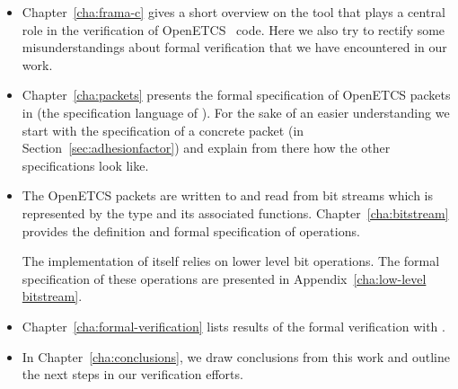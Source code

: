 \begin{itemize}
\item
Chapter~\ref{cha:frama-c} gives a short overview on the \framacwp tool
that plays a central role in the verification of OpenETCS \isoc~code.
Here we also try to rectify some misunderstandings about formal verification
that we have encountered in our work.

\item
Chapter~\ref{cha:packets} presents the formal specification of OpenETCS
packets in \acsl (the specification language of \framac).
For the sake of an easier understanding we start with the specification of
a concrete packet (\adhesion in Section~\ref{sec:adhesionfactor})
and explain from there how the other specifications look like.

\item
The OpenETCS packets are written to and read from bit streams which is represented
by the type  and its associated functions.
Chapter~\ref{cha:bitstream} provides the definition and formal specification
of  operations.

The implementation of  itself relies on lower level bit operations.
The formal specification of these operations are presented in Appendix~\ref{cha:low-level bitstream}.

\item 
Chapter~\ref{cha:formal-verification} lists results of the formal verification with \framacwp.

\item
In Chapter~\ref{cha:conclusions}, we draw conclusions from this work
and outline the next steps in our verification efforts.
\end{itemize}

